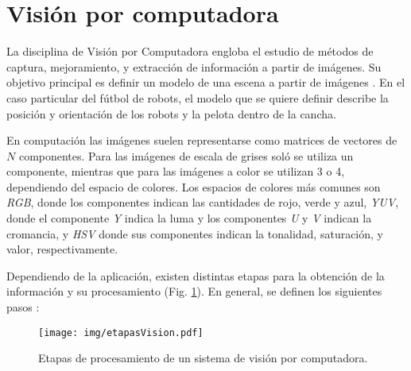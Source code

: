 
\section{Visión por computadora}

\label{mt_visionComputadora}

La disciplina de Visión por Computadora engloba el estudio de métodos de
captura, mejoramiento, y extracción de información a partir de imágenes. Su
objetivo principal es definir un modelo de una escena a partir de
imágenes \cite{cvLinda2001}. En el caso particular del fútbol de robots, el
modelo que se quiere definir describe la posición y orientación de los robots y
la pelota dentro de la cancha.

En computación las imágenes suelen representarse como matrices de vectores de
$N$ componentes. Para las imágenes de escala de grises soló se utiliza un
componente, mientras que para las imágenes a color se utilizan 3 o 4,
dependiendo del espacio de colores. Los espacios de colores más comunes son
\emph{RGB}, donde los componentes indican las cantidades de rojo, verde y
azul, \emph{YUV}, donde el componente \emph{Y} indica la luma y los
componentes \emph{U} y \emph{V} indican la cromancia, y \emph{HSV} donde sus
componentes indican la tonalidad, saturación, y valor, respectivamente.

Dependiendo de la aplicación, existen distintas etapas para la obtención de la
información y su procesamiento (Fig. \ref{etapasVision}). En general, se definen los
siguientes pasos \cite{digitalImageProcessing2ed,wikiCV}:

\begin{figure}[h]

	\centering
	\texttt{[image: img/etapasVision.pdf]}
	\caption{Etapas de procesamiento de un sistema de visión por
	computadora.}

	\label{etapasVision}

\end{figure}

